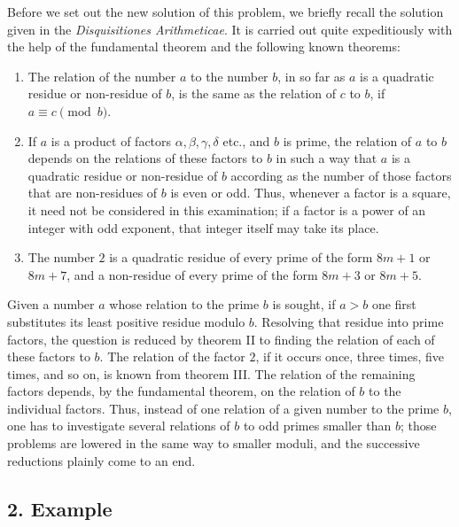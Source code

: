 \documentclass[12pt]{article}
\begin{document}
Before we set out the new solution of this problem, we briefly recall the solution given in the \emph{Disquisitiones Arithmeticae}. It is carried out quite expeditiously with the help of the fundamental theorem and the following known theorems:
\begin{enumerate}[label=\Roman*.]
\item The relation of the number $a$ to the number $b$, in so far as $a$ is a quadratic residue or non-residue of $b$, is the same as the relation of $c$ to $b$, if $a\equiv c\pmod b$.
\item If $a$ is a product of factors $\alpha,\beta,\gamma,\delta$ etc., and $b$ is prime, the relation of $a$ to $b$ depends on the relations of these factors to $b$ in such a way that $a$ is a quadratic residue or non-residue of $b$ according as the number of those factors that are non-residues of $b$ is even or odd. Thus, whenever a factor is a square, it need not be considered in this examination; if a factor is a power of an integer with odd exponent, that integer itself may take its place.
\item The number $2$ is a quadratic residue of every prime of the form $8m+1$ or $8m+7$, and a non-residue of every prime of the form $8m+3$ or $8m+5$.
\end{enumerate}

Given a number $a$ whose relation to the prime $b$ is sought, if $a>b$ one first substitutes its least positive residue modulo $b$. Resolving that residue into prime factors, the question is reduced by theorem II to finding the relation of each of these factors to $b$. The relation of the factor $2$, if it occurs once, three times, five times, and so on, is known from theorem III. The relation of the remaining factors depends, by the fundamental theorem, on the relation of $b$ to the individual factors. Thus, instead of one relation of a given number to the prime $b$, one has to investigate several relations of $b$ to odd primes smaller than $b$; those problems are lowered in the same way to smaller moduli, and the successive reductions plainly come to an end.

\subsection*{2. Example}
\end{document}
